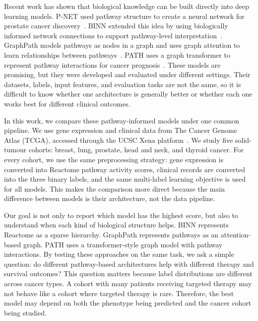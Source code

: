 Recent work has shown that biological knowledge can be built directly into
deep learning models. P-NET used pathway structure to create a neural
network for prostate cancer discovery~\cite{elmarakeby2021pnet}. BINN
extended this idea by using biologically informed network connections to
support pathway-level interpretation~\cite{hartman2023binn}. GraphPath
models pathways as nodes in a graph and uses graph attention to learn
relationships between pathways~\cite{ma2024graphpath,velickovic2018gat}.
PATH uses a graph transformer to represent pathway interactions for cancer
prognosis~\cite{howlader2026path}. These models are promising, but they
were developed and evaluated under different settings. Their datasets,
labels, input features, and evaluation tasks are not the same, so it is
difficult to know whether one architecture is generally better or whether
each one works best for different clinical outcomes.

In this work, we compare these pathway-informed models under one common
pipeline. We use gene expression and clinical data from The Cancer Genome
Atlas (TCGA), accessed through the UCSC Xena platform~\cite{Weinstein2013,
xena2020}. We study five solid-tumour cohorts: breast, lung, prostate, head
and neck, and thyroid cancer. For every cohort, we use the same preprocessing
strategy: gene expression is converted into Reactome pathway activity scores,
clinical records are converted into the three binary labels, and the same
multi-label learning objective is used for all models. This makes the
comparison more direct because the main difference between models is their
architecture, not the data pipeline.

Our goal is not only to report which model has the highest score, but also
to understand when each kind of biological structure helps. BINN represents
Reactome as a sparse hierarchy. GraphPath represents pathways as an
attention-based graph. PATH uses a transformer-style graph model with
pathway interactions. By testing these approaches on the same task, we ask a
simple question: do different pathway-based architectures help with
different therapy and survival outcomes? This question matters because label
distributions are different across cancer types. A cohort with many patients
receiving targeted therapy may not behave like a cohort where targeted
therapy is rare. Therefore, the best model may depend on both the phenotype
being predicted and the cancer cohort being studied.

